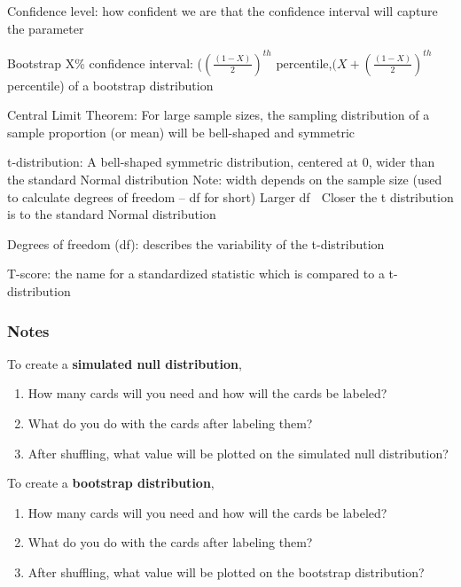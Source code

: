 \documentclass[
]{report}
\newcommand{\rgs}{\vspace{12pt}} %
\begin{document}
Confidence level: how confident we are that the confidence interval will capture the parameter

Bootstrap X\% confidence interval: (\((\frac{(1-X)}{2})^{th}\) percentile,\((X+(\frac{(1-X)}{2})^{th}\) percentile) of a bootstrap distribution

Central Limit Theorem: For large sample sizes, the sampling distribution of a sample proportion (or mean) will be bell-shaped and symmetric

t-distribution: A bell-shaped symmetric distribution, centered at 0, wider than the standard Normal distribution
Note: width depends on the sample size (used to calculate degrees of freedom -- df for short)
Larger df  Closer the t distribution is to the standard Normal distribution

Degrees of freedom (df): describes the variability of the t-distribution

T-score: the name for a standardized statistic which is compared to a t-distribution

\hypertarget{notes-26}{%
\subsubsection*{Notes}\label{notes-26}}

To create a \textbf{simulated null distribution},

\begin{enumerate}
\def\labelenumi{\arabic{enumi}.}
\item
  How many cards will you need and how will the cards be labeled?
  \rgs
\item
  What do you do with the cards after labeling them?
  \rgs
\item
  After shuffling, what value will be plotted on the simulated null distribution?
  \rgs
\end{enumerate}

To create a \textbf{bootstrap distribution},

\begin{enumerate}
\def\labelenumi{\arabic{enumi}.}
\item
  How many cards will you need and how will the cards be labeled?
  \rgs
\item
  What do you do with the cards after labeling them?
  \rgs
\item
  After shuffling, what value will be plotted on the bootstrap distribution?
  \rgs
\end{enumerate}
\end{document}
